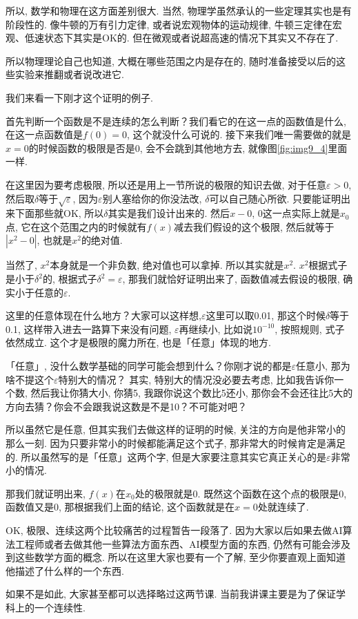 所以, 数学和物理在这方面差别很大. 当然, 物理学虽然承认的一些定理其实也是有阶段性的. 像牛顿的万有引力定律, 或者说宏观物体的运动规律, 牛顿三定律在宏观、低速状态下其实是OK的. 但在微观或者说超高速的情况下其实又不存在了. 

所以物理理论自己也知道, 大概在哪些范围之内是存在的, 随时准备接受以后的这些实验来推翻或者说改进它. 

我们来看一下刚才这个证明的例子. 

首先判断一个函数是不是连续的怎么判断？我们看它的在这一点的函数值是什么, 在这一点函数值是$f(0) = 0$, 这个就没什么可说的. 接下来我们唯一需要做的就是$x=0$的时候函数的极限是否是0, 会不会跳到其他地方去, 就像图\ref{fig:img9_4}里面一样. 

在这里因为要考虑极限, 所以还是用上一节所说的极限的知识去做, 对于任意$\varepsilon > 0$,  然后取$\delta$等于$\sqrt{\varepsilon}$, 因为$\varepsilon$别人塞给你的你没法改, $\delta$可以自己随心所欲. 只要能证明出来下面那些就OK, 所以$\delta$其实是我们设计出来的. 然后$x-0$, 0这一点实际上就是$x_0$点, 它在这个范围之内的时候就有$f(x)$减去我们假设的这个极限, 然后就等于$|x^2 - 0|$, 也就是$x^2$的绝对值. 

当然了, $x^2$本身就是一个非负数, 绝对值也可以拿掉. 所以其实就是$x^2$. $x^2$根据式子是小于$\delta^2$的, 根据式子$\delta^2 = \varepsilon$,  那我们就恰好证明出来了, 函数值减去假设的极限, 确实小于任意的$\varepsilon$. 

这里的任意体现在什么地方？大家可以这样想,$\varepsilon$这里可以取0.01, 那这个时候$\delta$等于0.1, 这样带入进去一路算下来没有问题, $\varepsilon$再继续小, 比如说$10^{-10}$, 按照规则, 式子依然成立. 这个才是极限的魔力所在, 也是「任意」体现的地方. 

「任意」, 没什么数学基础的同学可能会想到什么？你刚才说的都是$\varepsilon$任意小, 那为啥不提这个$\varepsilon$特别大的情况？ 其实, 特别大的情况没必要去考虑, 比如我告诉你一个数, 然后我让你猜大小, 你猜5, 我跟你说这个数比5还小, 那你会不会还往比5大的方向去猜？你会不会跟我说这数是不是10？不可能对吧？

所以虽然它是任意, 但其实我们去做这样的证明的时候, 关注的方向是他非常小的那么一刻. 因为只要非常小的时候都能满足这个式子, 那非常大的时候肯定是满足的. 所以虽然写的是「任意」这两个字, 但是大家要注意其实它真正关心的是$\varepsilon$非常小的情况. 

那我们就证明出来, $f(x)$在$x_0$处的极限就是0. 既然这个函数在这个点的极限是0, 函数值又是0, 那根据我们上面的结论, 这个函数就是在$x=0$处就连续了. 

OK, 极限、连续这两个比较痛苦的过程暂告一段落了. 因为大家以后如果去做AI算法工程师或者去做其他一些算法方面东西、AI模型方面的东西, 仍然有可能会涉及到这些数学方面的概念. 所以在这里大家也要有一个了解, 至少你要直观上面知道他描述了什么样的一个东西. 

如果不是如此, 大家甚至都可以选择略过这两节课. 当前我讲课主要是为了保证学科上的一个连续性. 

